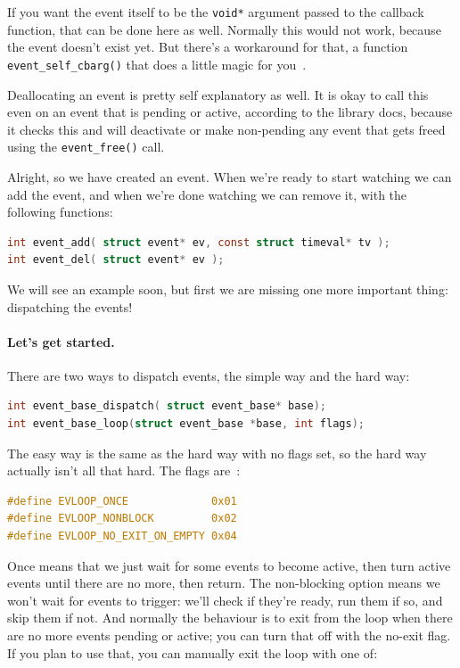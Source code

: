 \documentclass[a4paper]{report}
\begin{document}
If you want the event itself to be the \texttt{void*} argument passed to the callback function, that can be done here as well. Normally this would not work, because the event doesn't exist yet. But there's a workaround for that, a function \texttt{event\_self\_cbarg()} that does a little magic for you~\cite{libevent}.

Deallocating an event is pretty self explanatory as well. It is okay to call this even on an event that is pending or active, according to the library docs, because it checks this and will deactivate or make non-pending any event that gets freed using the \texttt{event\_free()} call.

Alright, so we have created an event. When we're ready to start watching we can add the event, and when we're done watching we can remove it, with the following functions:
\begin{lstlisting}[language=C]
int event_add( struct event* ev, const struct timeval* tv );
int event_del( struct event* ev );
\end{lstlisting}

We will see an example soon, but first we are missing one more important thing: dispatching the events!

\paragraph{Let's get started.}
There are two ways to dispatch events, the simple way and the hard way:
\begin{lstlisting}[language=C]
int event_base_dispatch( struct event_base* base);
int event_base_loop(struct event_base *base, int flags);
\end{lstlisting}

The easy way is the same as the hard way with no flags set, so the hard way actually isn't all that hard. The flags are~\cite{libevent}:
\begin{lstlisting}[language=C]
#define EVLOOP_ONCE             0x01
#define EVLOOP_NONBLOCK         0x02
#define EVLOOP_NO_EXIT_ON_EMPTY 0x04
\end{lstlisting}

Once means that we just wait for some events to become active, then turn active events until there are no more, then return. The non-blocking option means we won't wait for events to trigger: we'll check if they're ready, run them if so, and skip them if not. And normally the behaviour is to exit from the loop when there are no more events pending or active; you can turn that off with the no-exit flag. If you plan to use that, you can manually exit the loop with one of:
\end{document}

